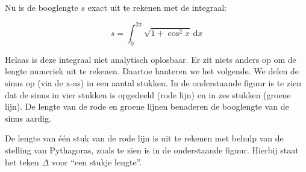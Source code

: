 \documentclass[a4paper,10pt,fleqn,twoside]{article}
\begin{document}
\begin{figure}[H]
\centering
{}%
\end{figure}
Nu is de booglengte $s$ exact uit te rekenen met de integraal:

\begin{equation*}
s = \int_0^{2\pi} \sqrt{1+\cos^2 x}\, \mathrm{d}x
\end{equation*}

Helaas is deze integraal niet analytisch oplosbaar. Er zit niets anders op om de lengte numeriek uit te rekenen. Daartoe hanteren we het volgende. We delen de sinus op (via de x-as) in een aantal stukken. In de onderstaande figuur is te zien dat de sinus in vier stukken is opgedeeld (rode lijn) en in zes stukken (groene lijn). De lengte van de rode en groene lijnen benaderen de booglengte van de sinus aardig.

\begin{figure}[H]
\centering
{}%
\end{figure}

De lengte van één stuk van de rode lijn is uit te rekenen met behulp van de stelling van Pythagoras, zoals te zien is in de onderstaande figuur. Hierbij staat het teken $\Delta$ voor ``een stukje lengte''.
\end{document}
